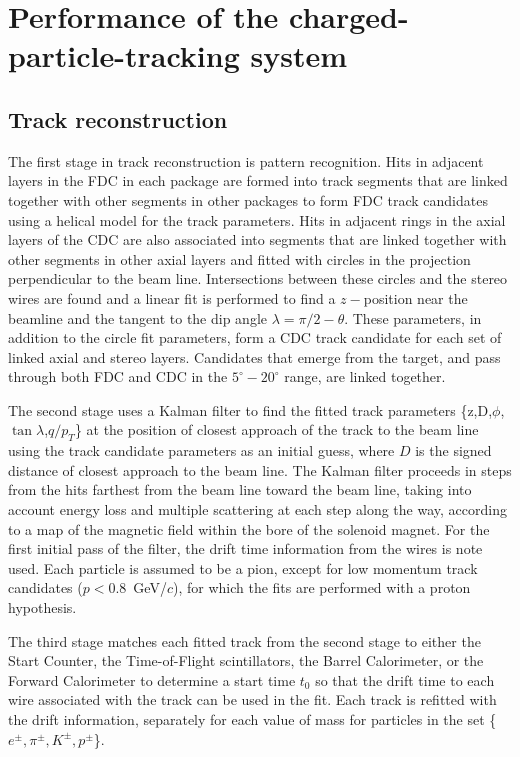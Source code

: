 \section[Performance of the charged-particle-tracking system]{Performance of the charged-particle-tracking system \label{sec:trackingperformance}}
\subsection{Track reconstruction}

The first stage in track reconstruction is pattern recognition.  Hits in adjacent
 layers in the FDC in each package are formed into track segments that are 
linked together with other segments in other packages to form FDC track 
candidates using a helical model for the track parameters.
Hits in adjacent rings in the axial layers of the CDC are also associated into 
segments that are linked together with other segments in other axial layers
and fitted with circles in the projection perpendicular to the beam line. Intersections between these circles and the stereo wires are found and a linear fit is performed to find a $z-$position near the beamline and the tangent to the dip
 angle $\lambda=\pi/2-\theta$.  These parameters, in addition to the circle fit 
parameters, form a CDC track candidate for each set of linked axial and stereo 
layers. Candidates that emerge from the target, and pass through both FDC and CDC in the  $5^\circ-20^\circ$ range, are linked together.

The second stage uses a Kalman filter \cite{KalmanFilter, KalmanFilter2} to find the fitted track parameters
\{z,D,$\phi$,$\tan\lambda$,$q/p_T$\}
at the position of closest approach of the track to the beam line using the 
track candidate parameters as an initial guess, where $D$ is the signed 
distance of closest approach to the beam line.  The Kalman filter proceeds in 
steps from
the hits farthest from the beam line toward the beam line, taking into account
energy loss and multiple scattering at each step along the way, according to a
map of the magnetic field within the bore of the solenoid magnet.  For the 
first initial pass of the filter, the drift time information from the 
wires is note used.  Each particle is assumed to be a pion, except for low momentum track 
candidates ($p<0.8$~GeV/$c$), for which the fits are performed with a proton hypothesis.

The third stage matches each fitted track from the second 
stage to either the Start Counter, the Time-of-Flight scintillators, the Barrel Calorimeter, or the 
Forward Calorimeter to determine a start time $t_0$ so that the drift time to each wire 
associated with the track can be used in the fit.  Each track is refitted with
the drift information, separately for each value of mass for particles in the set \{$e^\pm,\pi^\pm,K^\pm,p^\pm$\}.




